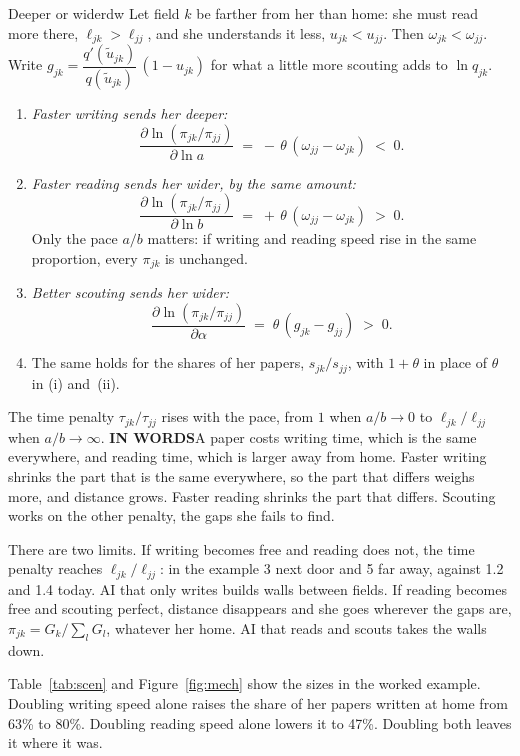 \documentclass[11pt,letterpaper]{article}
\newcommand{\inwords}{{\sffamily\bfseries\footnotesize\color{hbluedark}IN WORDS}\enspace}
\newcommand{\ut}{\tilde u}
\begin{document}
\begin{prop}{Deeper or wider}{dw}
Let field $k$ be farther from her than home: she must read more there, $\ell_{jk}>\ell_{jj}$, and she understands it less, $u_{jk}<u_{jj}$. Then $\omega_{jk}<\omega_{jj}$. Write $g_{jk}=\dfrac{q'(\ut_{jk})}{q(\ut_{jk})}\,(1-u_{jk})$ for what a little more scouting adds to $\ln q_{jk}$.
\begin{enumerate}[label=(\roman*),leftmargin=2em]
\item \emph{Faster writing sends her deeper:}
\[\frac{\partial\ln(\pi_{jk}/\pi_{jj})}{\partial\ln a}\;=\;-\,\theta\,(\omega_{jj}-\omega_{jk})\;<\;0 .\]
\item \emph{Faster reading sends her wider, by the same amount:}
\[\frac{\partial\ln(\pi_{jk}/\pi_{jj})}{\partial\ln b}\;=\;+\,\theta\,(\omega_{jj}-\omega_{jk})\;>\;0 .\]
Only the pace $a/b$ matters: if writing and reading speed rise in the same proportion, every $\pi_{jk}$ is unchanged.
\item \emph{Better scouting sends her wider:}
\[\frac{\partial\ln(\pi_{jk}/\pi_{jj})}{\partial\alpha}\;=\;\theta\,(g_{jk}-g_{jj})\;>\;0 .\]
\item The same holds for the shares of her papers, $s_{jk}/s_{jj}$, with $1+\theta$ in place of $\theta$ in (i) and~(ii).
\end{enumerate}
The time penalty $\tau_{jk}/\tau_{jj}$ rises with the pace, from $1$ when $a/b\to0$ to $\ell_{jk}/\ell_{jj}$ when $a/b\to\infty$.
\tcblower
\inwords A paper costs writing time, which is the same everywhere, and reading time, which is larger away from home. Faster writing shrinks the part that is the same everywhere, so the part that differs weighs more, and distance grows. Faster reading shrinks the part that differs. Scouting works on the other penalty, the gaps she fails to find.

There are two limits. If writing becomes free and reading does not, the time penalty reaches $\ell_{jk}/\ell_{jj}$: in the example 3 next door and 5 far away, against 1.2 and 1.4 today. AI that only writes builds walls between fields. If reading becomes free and scouting perfect, distance disappears and she goes wherever the gaps are, $\pi_{jk}=G_k/\sum_lG_l$, whatever her home. AI that reads and scouts takes the walls down.
\end{prop}

Table~\ref{tab:scen} and Figure~\ref{fig:mech} show the sizes in the worked example. Doubling writing speed alone raises the share of her papers written at home from 63\% to 80\%. Doubling reading speed alone lowers it to 47\%. Doubling both leaves it where it was.
\end{document}
